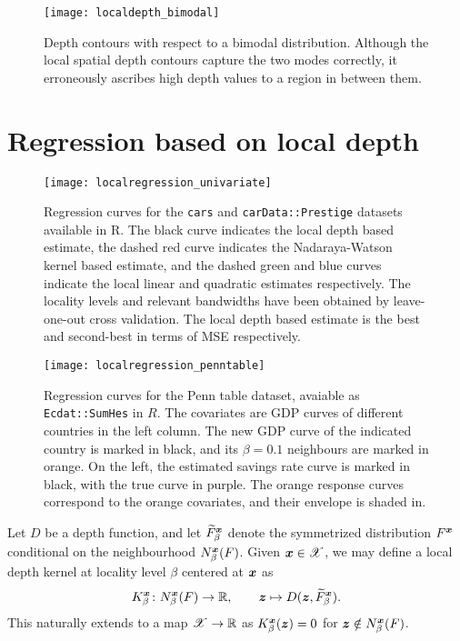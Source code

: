 \begin{figure}
    \centering
    \texttt{[image: localdepth\_bimodal]}
    \caption{
        Depth contours with respect to a bimodal distribution.
        Although the local spatial depth contours capture the two modes
        correctly, it erroneously ascribes high depth values to a region in
        between them.
    }
    \label{fig:localdepth_bimodal}
\end{figure}


\section{Regression based on local depth}
\label{sec:localdepth_regression}

\begin{figure}
    \centering
    \texttt{[image: localregression\_univariate]}
    \caption{
        Regression curves for the \texttt{cars} and \texttt{carData::Prestige}
        datasets available in R.
        The black curve indicates the local depth based estimate, the dashed
        red curve indicates the Nadaraya-Watson kernel based estimate, and the
        dashed green and blue curves indicate the local linear and quadratic
        estimates respectively.
        The locality levels and relevant bandwidths have been obtained by
        leave-one-out cross validation.
        The local depth based estimate is the best and second-best in terms of
        MSE respectively.
    }
    \label{fig:localregression_univariate}
\end{figure}


\begin{figure}
    \centering
    \texttt{[image: localregression\_penntable]}
    \caption{
        Regression curves for the Penn table dataset, avaiable as
        \texttt{Ecdat::SumHes} in $R$.
        The covariates are GDP curves of different countries in the left
        column.
        The new GDP curve of the indicated country is marked in black, and its
        $\beta = 0.1$ neighbours are marked in orange.
        On the left, the estimated savings rate curve is marked in black, with
        the true curve in purple.
        The orange response curves correspond to the orange covariates, and
        their envelope is shaded in.
    }
    \label{fig:localregression_penn}
\end{figure}


\begin{definition}
    Let $D$ be a depth function, and let $\widetilde{F}^{\bm{x}}_\beta$ denote
    the symmetrized distribution $F^{\bm{x}}$ conditional on the neighbourhood
    $N^{\bm{x}}_\beta(F)$.
    Given $\bm{x} \in \mathscr{X}$, we may define a local depth kernel at
    locality level $\beta$ centered at $\bm{x}$ as
    \begin{equation}
        K^{\bm{x}}_\beta\colon N^{\bm{x}}_\beta(F) \to \mathbb{R}, \qquad
        \bm{z} \mapsto D(\bm{z}, \widetilde{F}^{\bm{x}}_\beta).
    \end{equation}
    This naturally extends to a map $\mathscr{X} \to \mathbb{R}$ as
    $K^{\bm{x}}_\beta(\bm{z}) = 0$ for $\bm{z} \notin N^{\bm{x}}_\beta(F)$.
\end{definition}

